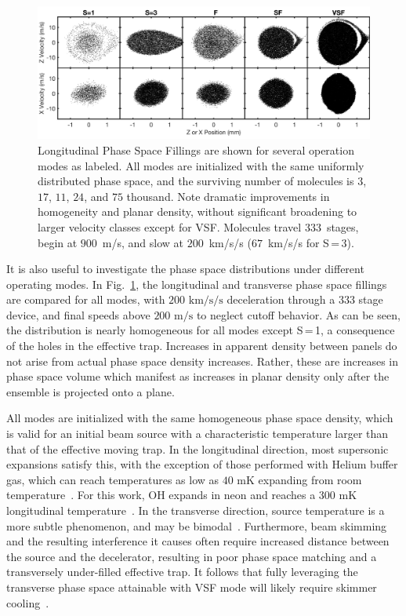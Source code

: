 \documentclass[%
 reprint,
 amsmath,amssymb,
 aps,
prl,
]{revtex4-1}
\begin{document}
\begin{figure}[t]
\includegraphics[width=\linewidth]{5x2-PSD-Compare.png}
\vspace{-22pt}
\caption{\label{fig:phasespace}
Longitudinal Phase Space Fillings are shown for several operation modes as labeled. 
All modes are initialized with the same uniformly distributed phase space, and the surviving number of molecules is $3$, $17$, $11$, $24$, and $75$ thousand.
Note dramatic improvements in homogeneity and planar density, without significant broadening to larger velocity classes except for VSF. 
Molecules travel $333$~stages, begin at $900$~m/s, and slow at $200$~km/s/s ($67$~km/s/s for S\,=\,3).
}
\end{figure}

It is also useful to investigate the phase space distributions under different operating modes.
In Fig.~\ref{fig:phasespace}, the longitudinal and transverse phase space fillings are compared for all modes, with $200\text{ km/s/s}$ deceleration through a 333 stage device, and final speeds above $200\text{ m/s}$ to neglect cutoff behavior. 
As can be seen, the distribution is nearly homogeneous for all modes except S\,=\,1, a consequence of the holes in the effective trap. 
Increases in apparent density between panels do not arise from actual phase space density increases. 
Rather, these are increases in phase space volume which manifest as increases in planar density only after the ensemble is projected onto a plane.

All modes are initialized with the same homogeneous phase space density, which is valid for an initial beam source with a characteristic temperature larger than that of the effective moving trap.
In the longitudinal direction, most supersonic expansions satisfy this, with the exception of those performed with Helium buffer gas, which can reach temperatures as low as $40\text{ mK}$ expanding from room temperature~\cite{Even2014}.
For this work, OH expands in neon and reaches a $300\text{ mK}$ longitudinal temperature~\cite{Wu2018}.
In the transverse direction, source temperature is a more subtle phenomenon, and may be bimodal~\cite{Beijerinck1981}.
Furthermore, beam skimming and the resulting interference it causes often require increased distance between the source and the decelerator, resulting in poor phase space matching and a transversely under-filled effective trap.
It follows that fully leveraging the transverse phase space attainable with VSF mode will likely require skimmer cooling~\cite{Wu2018}.
\end{document}
